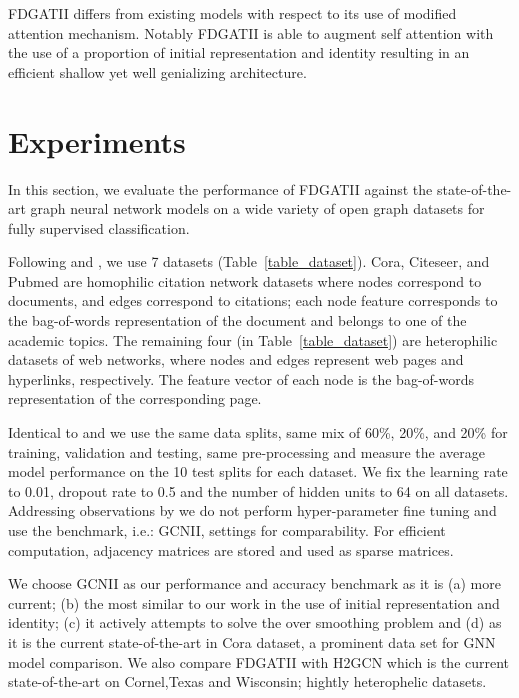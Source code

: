 \documentclass{article}
\begin{document}
FDGATII differs from existing models with respect to its use of modified attention mechanism. Notably FDGATII is able to augment self attention with the use of a proportion of initial representation and identity resulting in an efficient shallow yet well genializing architecture. 

\section{Experiments}
In this section, we evaluate the performance of FDGATII against the state-of-the-art graph neural network models on a wide variety of open graph datasets for fully supervised classification.

Following \citet{pei2019geom} and \citet{chen2020simple} , we use 7 datasets (Table~\ref{table_dataset}). Cora, Citeseer, and Pubmed are homophilic citation network datasets where nodes correspond to documents, and edges correspond to citations; each node feature corresponds to the bag-of-words representation of the document and belongs to one of the academic topics. The remaining four (in Table~\ref{table_dataset}) are heterophilic datasets of web networks, where nodes and edges represent web pages and hyperlinks, respectively. The feature vector of each node is the bag-of-words representation of the corresponding page. 

Identical to \citet{pei2019geom} and \citet{chen2020simple} we use the same data splits, same mix of 60\%, 20\%, and 20\% for training, validation and testing, same pre-processing and measure the average model performance on the 10 test splits for each dataset. We fix the learning rate to 0.01, dropout rate to 0.5 and the number of hidden units to 64 on all datasets. Addressing observations by \citet{alon2020bottleneck} we do not perform  hyper-parameter fine tuning and use the benchmark, i.e.: GCNII, settings for comparability. For efficient computation, adjacency matrices are stored and used as sparse matrices.

We choose GCNII \cite{chen2020simple} as our performance and accuracy benchmark as it is (a) more current; (b) the most similar to our work in the use of initial representation and identity; (c) it actively attempts to solve the over smoothing problem and (d) as it is the current state-of-the-art in Cora dataset, a prominent data set for GNN model comparison. We also compare FDGATII with H2GCN \cite{zhu2020beyond} which is the current state-of-the-art on Cornel,Texas and Wisconsin; hightly heterophelic datasets.
\end{document}
